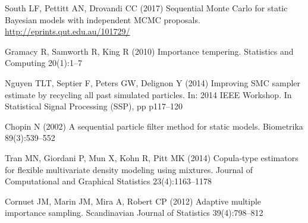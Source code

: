 \documentclass[12pt]{article}
\begin{document}
\begin{thebibliography}{1}	


South LF, Pettitt AN, Drovandi CC (2017) Sequential {M}onte {C}arlo for static
  {B}ayesian models with independent {MCMC} proposals.
  \url{http://eprints.qut.edu.au/101729/}

Gramacy R, Samworth R, King R (2010) Importance tempering. Statistics and
  Computing 20(1):1--7

Nguyen TLT, Septier F, Peters GW, Delignon Y (2014) Improving {SMC} sampler
  estimate by recycling all past simulated particles. In: 2014 IEEE Workshop.
  In Statistical Signal Processing (SSP), pp p117--120

Chopin N (2002) A sequential particle filter method for static models.
  Biometrika 89(3):539--552

Tran MN, Giordani P, Mun X, Kohn R, Pitt MK (2014) Copula-type estimators for
  flexible multivariate density modeling using mixtures. Journal of
  Computational and Graphical Statistics 23(4):1163--1178

Cornuet JM, Marin JM, Mira A, Robert CP (2012) Adaptive multiple importance
  sampling. Scandinavian Journal of Statistics 39(4):798--812
      	
\end{thebibliography}
\end{document}
